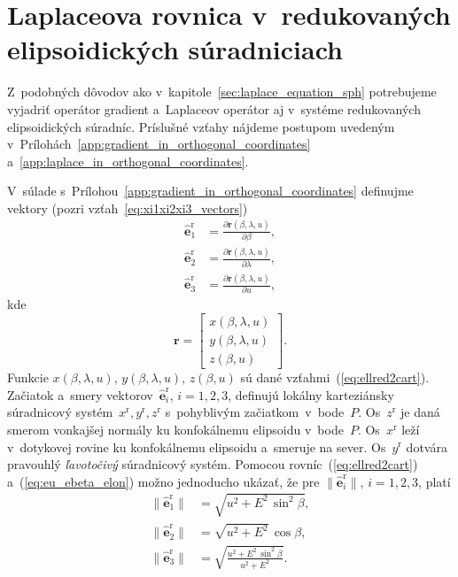 \documentclass[a4paper, 12pt]{book}
\let\vec\mathbf
\begin{document}
\section{Laplaceova rovnica v~redukovaných elipsoidických súradniciach}
\label{sec:laplace_in_reduced_ell_coords}

Z~podobných dôvodov ako v~kapitole~\ref{sec:laplace_equation_sph} potrebujeme 
vyjadriť operátor gradient a~Laplaceov operátor aj v~systéme redukovaných 
elipsoidických súradníc.  Príslušné vzťahy nájdeme postupom uvedeným 
v~Prílohách~\ref{app:gradient_in_orthogonal_coordinates} 
a~\ref{app:laplace_in_orthogonal_coordinates}.

V~súlade s~Prílohou~\ref{app:gradient_in_orthogonal_coordinates} definujme 
vektory (pozri vzťah~\ref{eq:xi1xi2xi3_vectors})
%
\begin{equation}
\label{eq:eu_ebeta_elon}
\begin{split}
\hat{\vec e}_1^\mathrm{r} &= \frac{\partial \vec r(\beta, \lambda, u)}{\partial 
\beta}{,}\\
%
\hat{\vec e}_2^\mathrm{r} &= \frac{\partial \vec r(\beta, \lambda, u)}{\partial 
\lambda}{,}\\
%
\hat{\vec e}_3^\mathrm{r} &= \frac{\partial \vec r(\beta, \lambda, u)}{\partial 
u}{,}
\end{split}
\end{equation}
%
kde
%
\begin{equation}
\vec r =
%
\begin{bmatrix}
x(\beta, \lambda, u)\\
y(\beta, \lambda, u)\\
z(\beta, u)
\end{bmatrix}
{.}
%
\end{equation}
%
Funkcie $x(\beta, \lambda, u)$, $y(\beta, \lambda, u)$, $z(\beta, u)$ sú dané 
vzťahmi~(\ref{eq:ellred2cart}).  Začiatok a~smery vektorov~$\hat{\vec 
e}_i^\mathrm{r}$, $i = 1, 2, 3$, definujú lokálny karteziánsky súradnicový 
systém~$x^\mathrm{r}, y^\mathrm{r}, z^\mathrm{r}$ s~pohyblivým 
začiatkom~v~bode~$P$.  Os~$z^\mathrm{r}$ je daná smerom vonkajšej normály ku 
konfokálnemu elipsoidu v~bode~$P$.  Os~$x^\mathrm{r}$ leží v~dotykovej rovine 
ku konfokálnemu elipsoidu a~smeruje na sever.  Os~$y^\mathrm{r}$ dotvára 
pravouhlý \emph{ľavotočivý} súradnicový systém.
%
Pomocou rovníc~(\ref{eq:ellred2cart}) a~(\ref{eq:eu_ebeta_elon}) možno 
jednoducho ukázať, že pre $\| \hat{\vec e}_i^\mathrm{r} \|$, $i = 1, 2, 3$, 
platí
%
\begin{equation}
\label{eq:ei_reduced_ell_magnitudes}
\begin{split}
\| \hat{\vec e}_1^\mathrm{r} \| &= \sqrt{u^2 + E^2 \, \sin^2\beta}{,}\\
%
\| \hat{\vec e}_2^\mathrm{r} \| &= \sqrt{ u^2 + E^2} \, \cos\beta{,}\\
%
\| \hat{\vec e}_3^\mathrm{r} \| &= \sqrt{\frac{u^2 + E^2 \, \sin^2\beta}{u^2 
+ E^2}}{.}
\end{split}
\end{equation}
\end{document}

